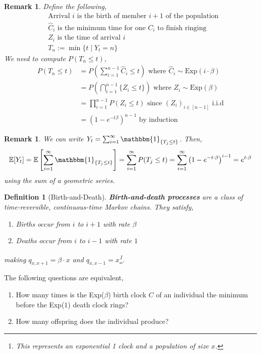 \documentclass{tufte-handout}
\newtheorem{defn}[thm]{Definition}
\newtheorem{rmk}[thm]{Remark}
\begin{document}
\begin{rmk}
  Define the following,
  \begin{align*}
    &\text{Arrival $i$ is the birth of member $i+1$ of the population} \\
    &\text{$\hat{C}_i$ is the minimum time for one $C_i$ to finish ringing} \\
    &\text{$Z_i$ is the time of arrival $i$} \\
    &\text{$T_n := \min \{t \mid Y_t = n\}$}
  \end{align*}
  \noindent We need to compute $P(T_n \leq t)$,
  \begin{align*}
    P(T_n \leq t)
    &= P\left(\sum_{i=1}^{n-1} \hat{C}_i \leq t\right) \text{ where } \hat{C}_i \sim \text{Exp}(i \cdot \beta) \\
    &= P\left(\bigcap_{i=1}^{n-1} \{Z_i \leq t\}\right) \text{ where } Z_i \sim \text{Exp}(\beta)\\
    &= \prod_{i=1}^{n-1} P(Z_i \leq t) \text{ since $(Z_i)_{i \in [n-1]}$ i.i.d} \\
    &= (1 - e^{-t\beta})^{n-1} \text{ by induction}
  \end{align*}
\end{rmk}

\begin{rmk}
  We can write $Y_t = \sum_{i=1}^{\infty} \mathbbm{1}_{\{T_j \leq t\}}$. Then,
  \[\mathbb{E}[Y_t] = \mathbb{E}\left[\sum_{i=1}^{\infty} \mathbbm{1}_{\{T_j \leq t\}} \right] = \sum_{i=1}^{\infty} P(T_j \leq t) = \sum_{i=1}^{\infty} \left(1 - e^{-t \cdot \beta}\right)^{i-1} = e^{t \cdot \beta}\]
  \noindent using the sum of a geometric series.
\end{rmk}

\begin{defn}[Birth-and-Death]
  \textbf{Birth-and-death processes} are a class of time-reversible, continuous-time Markov chains. They satisfy,
  \begin{enumerate}
    \item Births occur from $i$ to $i + 1$ with rate $\beta$
    \item Deaths occur from $i$ to $i - 1$ with rate $1$
  \end{enumerate}
  \noindent making $q_{x, x+1} = \beta \cdot x$ and $q_{x, x-1} = x$\footnote{This represents an exponential 1 clock and a population of size $x$.}.
\end{defn}

\begin{marginfigure}
  The following questions are equivalent,
  \begin{enumerate}
    \item How many times is the Exp($\beta$) birth clock $C$ of an individual the minimum before the Exp($1$) death clock rings?
    \item How many offspring does the individual produce?
  \end{enumerate}
\end{marginfigure}
\end{document}
